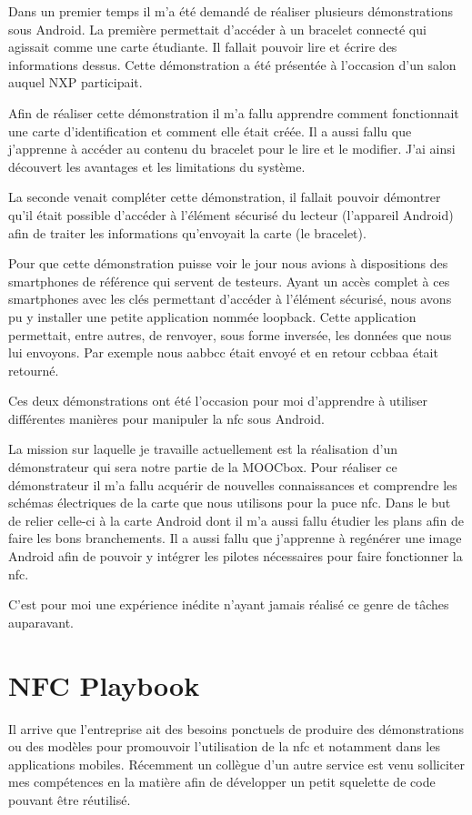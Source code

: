 \documentclass[french,12pt,a4paper,titlepage,openright,openbib]{report}
\begin{document}
Dans un premier temps il m'a été demandé de réaliser plusieurs démonstrations sous Android.
La première permettait d'accéder à un bracelet connecté qui agissait comme une carte étudiante. Il fallait pouvoir lire et écrire des informations dessus. Cette démonstration a été présentée à l'occasion d'un salon auquel NXP participait.

Afin de réaliser cette démonstration il m'a fallu apprendre comment fonctionnait une carte d'identification et comment elle était créée. Il a aussi fallu que j'apprenne à accéder au contenu du bracelet pour le lire et le modifier. J'ai ainsi découvert les avantages et les limitations du système.

La seconde venait compléter cette démonstration, il fallait pouvoir démontrer qu'il était possible d'accéder à l'élément sécurisé du lecteur (l'appareil Android) afin de traiter les informations qu'envoyait la carte (le bracelet).

Pour que cette démonstration puisse voir le jour nous avions à dispositions des smartphones de référence qui servent de testeurs. Ayant un accès complet à ces smartphones avec les clés permettant d'accéder à l'élément sécurisé, nous avons pu y installer une petite application nommée loopback. Cette application permettait, entre autres, de renvoyer, sous forme inversée, les données que nous lui envoyons. Par exemple nous aabbcc était envoyé et en retour ccbbaa était retourné.

Ces deux démonstrations ont été l'occasion pour moi d'apprendre à utiliser différentes manières pour manipuler la \gls{nfc} sous Android.

La mission sur laquelle je travaille actuellement est la réalisation d'un démonstrateur qui sera notre partie de la MOOCbox.
Pour réaliser ce démonstrateur il m'a fallu acquérir de nouvelles connaissances et comprendre les schémas électriques de la carte que nous utilisons pour la puce \gls{nfc}. Dans le but de relier celle-ci à la carte Android dont il m'a aussi fallu étudier les plans afin de faire les bons branchements.
Il a aussi fallu que j'apprenne à regénérer une image Android afin de pouvoir y intégrer les pilotes nécessaires pour faire fonctionner la \gls{nfc}.

C'est pour moi une expérience inédite n'ayant jamais réalisé ce genre de tâches auparavant.

\section{NFC Playbook}
Il arrive que l'entreprise ait des besoins ponctuels de produire des démonstrations ou des modèles pour promouvoir l'utilisation de la \gls{nfc} et notamment dans les applications mobiles.
Récemment un collègue d'un autre service est venu solliciter mes compétences en la matière afin de développer un petit squelette de code pouvant être réutilisé.
\end{document}
